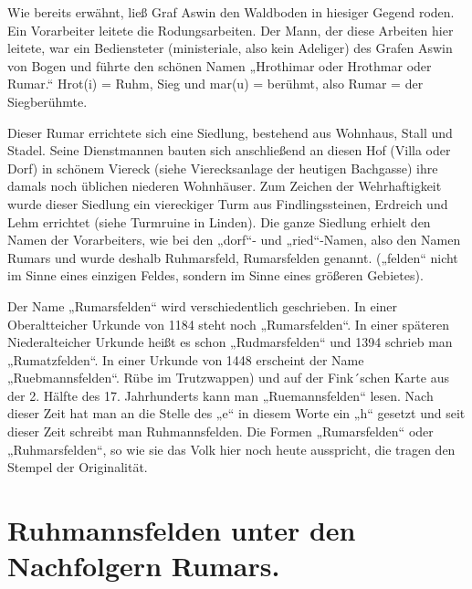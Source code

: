 \documentclass[12pt,a4pager]{book}
\begin{document}
Wie bereits erwähnt, ließ Graf Aswin den Waldboden in hiesiger Gegend roden. Ein
Vorarbeiter leitete die Rodungsarbeiten. Der Mann, der diese Arbeiten hier
leitete, war ein Bediensteter (ministeriale, also kein Adeliger) des Grafen
Aswin von Bogen und führte den schönen Namen „Hrothimar oder Hrothmar oder
Rumar.“ Hrot(i) = Ruhm, Sieg und mar(u) = berühmt, also Rumar = der
Siegberühmte.

Dieser Rumar errichtete sich eine Siedlung, bestehend aus Wohnhaus, Stall und
Stadel. Seine Dienstmannen bauten sich anschließend an diesen Hof (Villa oder
Dorf) in schönem Viereck (siehe Vierecksanlage der heutigen Bachgasse) ihre
damals noch üblichen niederen Wohnhäuser. Zum Zeichen der Wehrhaftigkeit wurde
dieser Siedlung ein viereckiger Turm aus Findlingssteinen, Erdreich und Lehm
errichtet (siehe Turmruine in Linden). Die ganze Siedlung erhielt den Namen der
Vorarbeiters, wie bei den „dorf“- und „ried“-Namen, also den Namen Rumars und
wurde deshalb Ruhmarsfeld, Rumarsfelden genannt. („felden“ nicht im Sinne eines
einzigen Feldes, sondern im Sinne eines größeren Gebietes).

Der Name „Rumarsfelden“ wird verschiedentlich geschrieben. In einer
Oberaltteicher Urkunde von 1184 steht noch „Rumarsfelden“. In einer späteren
Niederalteicher Urkunde heißt es schon „Rudmarsfelden“ und 1394 schrieb man
„Rumatzfelden“. In einer Urkunde von 1448 erscheint der Name „Ruebmannsfelden“.
Rübe im Trutzwappen) und auf der Fink´schen Karte aus der 2. Hälfte des 17.
Jahrhunderts kann man „Ruemannsfelden“ lesen. Nach dieser Zeit hat man an die
Stelle des „e“ in diesem Worte ein „h“ gesetzt und seit dieser Zeit schreibt man
Ruhmannsfelden. Die Formen „Rumarsfelden“ oder „Ruhmarsfelden“, so wie sie das
Volk hier noch heute ausspricht, die tragen den Stempel der Originalität.

\section{Ruhmannsfelden unter den Nachfolgern Rumars.}
\end{document}
